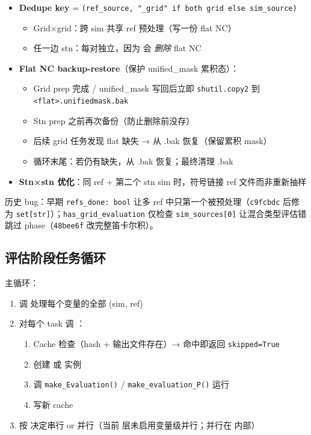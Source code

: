 \begin{itemize}
  \item \textbf{Dedupe key} = \texttt{(ref\_source, "\_grid" if both grid else sim\_source)}
  \begin{itemize}
    \item Grid×grid：跨 sim 共享 ref 预处理（写一份 flat NC）
    \item 任一边 stn：每对独立，因为  会 \emph{删除} flat NC
  \end{itemize}
  \item \textbf{Flat NC backup-restore}（保护 unified\_mask 累积态）：
  \begin{itemize}
    \item Grid prep 完成 / unified\_mask 写回后立即 \texttt{shutil.copy2} 到 \texttt{<flat>.unifiedmask.bak}
    \item Stn prep 之前再次备份（防止删除前没存）
    \item 后续 grid 任务发现 flat 缺失 → 从 .bak 恢复（保留累积 mask）
    \item 循环末尾：若仍有缺失，从 .bak 恢复；最终清理 .bak
  \end{itemize}
  \item \textbf{Stn×stn 优化}：同 ref + 第二个 stn sim 时，符号链接 ref 文件而非重新抽样
\end{itemize}

历史 bug：早期 \texttt{refs\_done: bool} 让多 ref 中只第一个被预处理（\texttt{c9fcbdc} 后修为 \texttt{set[str]}）；\texttt{has\_grid\_evaluation} 仅检查 \texttt{sim\_sources[0]} 让混合类型评估错跳过 phase（\texttt{48bee6f} 改完整笛卡尔积）。

\subsection{评估阶段任务循环}

 主循环：

\begin{enumerate}
  \item 调  处理每个变量的全部 (sim, ref)
  \item 对每个 task 调 ：
  \begin{enumerate}
    \item Cache 检查（hash + 输出文件存在）→ 命中即返回 \texttt{skipped=True}
    \item 创建  或  实例
    \item 调 \texttt{make\_Evaluation()} / \texttt{make\_evaluation\_P()} 运行
    \item 写新 cache
  \end{enumerate}
  \item 按  决定串行 or 并行（当前  层未启用变量级并行；并行在  内部）
\end{enumerate}

